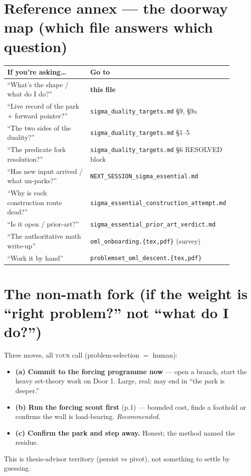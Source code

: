 \documentclass[9pt]{extarticle}
\newcommand{\file}[1]{\texttt{#1}}
\begin{document}
\section*{Reference annex --- the doorway map (which file answers which question)}

\begin{center}
\begin{tabular}{@{}p{0.5\linewidth}p{0.42\linewidth}@{}}
\toprule
\textbf{If you're asking\ldots} & \textbf{Go to} \\
\midrule
``What's the shape / what do I do?'' & \textbf{this file} \\
``Live record of the park $+$ forward pointer?'' & \file{sigma\_duality\_targets.md} \S9, \S9a \\
``The two sides of the duality?'' & \file{sigma\_duality\_targets.md} \S1--5 \\
``The predicate fork resolution?'' & \file{sigma\_duality\_targets.md} \S6 RESOLVED block \\
``Has new input arrived / what un-parks?'' & \file{NEXT\_SESSION\_sigma\_essential.md} \\
``Why is each construction route dead?'' & \file{sigma\_essential\_construction\_attempt.md} \\
``Is it open / prior-art?'' & \file{sigma\_essential\_prior\_art\_verdict.md} \\
``The authoritative math write-up'' & \file{oml\_onboarding.\{tex,pdf\}} (survey) \\
``Work it by hand'' & \file{problemset\_oml\_descent.\{tex,pdf\}} \\
\bottomrule
\end{tabular}
\end{center}

\section*{The non-math fork (if the weight is ``right problem?'' not ``what do I do?'')}

Three moves, all \textsc{your} call (problem-selection $=$ human):
\begin{itemize}[leftmargin=1.3em,topsep=1pt,itemsep=1pt]
  \item \textbf{(a) Commit to the forcing programme now} --- open a branch, start the
        heavy set-theory work on Door 1. Large, real; may end in ``the park is deeper.''
  \item \textbf{(b) Run the forcing scout first} (p.1) --- bounded cost, finds a foothold
        or confirms the wall is load-bearing. \emph{Recommended.}
  \item \textbf{(c) Confirm the park and step away.} Honest; the method named the residue.
\end{itemize}
This is thesis-advisor territory (persist vs pivot), not something to settle by guessing.
\end{document}
